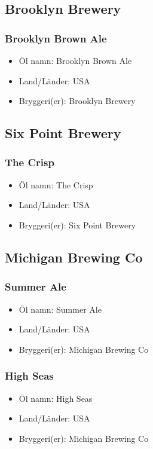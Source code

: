 \documentclass[11pt]{article}
\begin{document}
\subsection{Brooklyn Brewery}
\label{sec:org656d022}
\subsubsection{Brooklyn Brown Ale}
\label{sec:org7518d81}
\begin{itemize}
\item Öl namn: Brooklyn Brown Ale
\item Land/Länder: USA
\item Bryggeri(er): Brooklyn Brewery
\end{itemize}
\subsection{Six Point Brewery}
\label{sec:orgf5907ea}
\subsubsection{The Crisp}
\label{sec:orge16a5c6}
\begin{itemize}
\item Öl namn: The Crisp
\item Land/Länder: USA
\item Bryggeri(er): Six Point Brewery
\end{itemize}
\subsection{Michigan Brewing Co}
\label{sec:orgf152f38}
\subsubsection{Summer Ale}
\label{sec:org4c3a3c0}
\begin{itemize}
\item Öl namn: Summer Ale
\item Land/Länder: USA
\item Bryggeri(er): Michigan Brewing Co
\end{itemize}
\subsubsection{High Seas}
\label{sec:org10b7fda}
\begin{itemize}
\item Öl namn: High Seas
\item Land/Länder: USA
\item Bryggeri(er): Michigan Brewing Co
\end{itemize}
\end{document}
